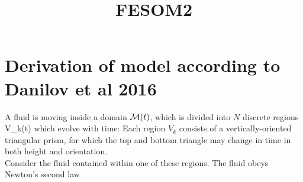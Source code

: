 \documentclass[10pt]{article}
\begin{document}
\title{FESOM2}
\date{}
\maketitle
\section{Derivation of model according to Danilov et al 2016}

A fluid is moving inside a domain $\mathcal{M}(t)$, which is divided into $N$ discrete regions V_{k}(t) which evolve with time:
Each region $V_{k}$ consists of a vertically-oriented triangular prism, for which the top and bottom triangle may change in time in both height and orientation. \\
Consider the fluid contained within one of these regions. The fluid obeys Newton's second law
	
\end{document}
